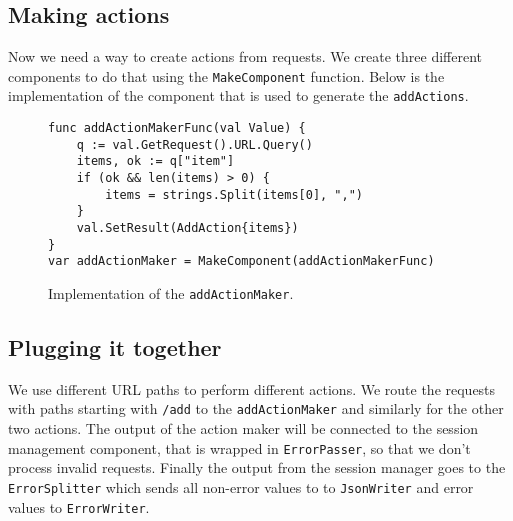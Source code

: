 \subsection{Making actions}
Now we need a way to create actions from requests. We create three different
components to do that using the \texttt{MakeComponent} function. Below
is the implementation of the component that is used to generate 
the \texttt{addActions}.
\begin{figure}[h]
\begin{lstlisting}
func addActionMakerFunc(val Value) {
    q := val.GetRequest().URL.Query()
    items, ok := q["item"]
    if (ok && len(items) > 0) {
        items = strings.Split(items[0], ",")
    }
    val.SetResult(AddAction{items})
}
var addActionMaker = MakeComponent(addActionMakerFunc) 
\end{lstlisting}
\caption[scale=1.0]{Implementation of the \texttt{addActionMaker}.}
\label{fig:addActionMaker}
\end{figure}

\newpage
\subsection{Plugging it together}
We use different URL paths to perform different actions. We route the 
requests with paths starting with \texttt{/add} to the \texttt{addActionMaker}
and similarly for the other two actions. The output of the action maker
will be connected to the session management component, that is wrapped in
\texttt{ErrorPasser}, so that we don't process invalid requests.
Finally the output from the session manager goes to the \texttt{ErrorSplitter}
which sends all non-error values to to \texttt{JsonWriter} and error
values to \texttt{ErrorWriter}. 

